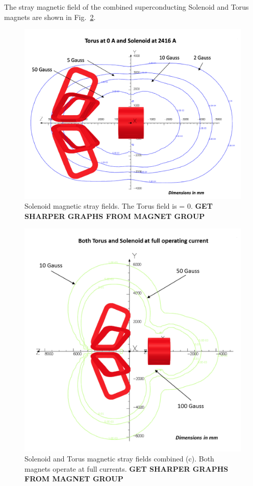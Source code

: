 \documentclass[final,3p,twocolumn]{elsarticle}
\begin{document}
The stray magnetic field of the combined superconducting Solenoid and Torus magnets are shown in Fig.~\ref{stray-field}. 
\begin{figure}[htbp!]
\centerline{\includegraphics[width=1.0\columnwidth]{mag-field-1.png}}
\caption{Solenoid magnetic stray fields. The Torus field is = 0. {\bf GET SHARPER GRAPHS FROM MAGNET GROUP}  }
\label{stray-field}
\end{figure}

\begin{figure}[htbp!]
\centerline{\includegraphics[width=1.2\columnwidth]{mag-field-2.png}}
\caption{Solenoid and Torus magnetic stray fields combined (c). Both magnets operate at full currents.  {\bf GET SHARPER GRAPHS FROM MAGNET GROUP}  }
\label{stray-field}
\end{figure}
\end{document}
